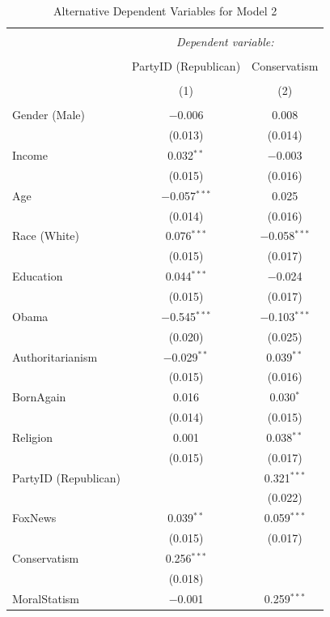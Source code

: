 \documentclass[12pt,]{article}
\begin{document}
\begin{table}[!htbp] \centering 
  \caption{Alternative Dependent Variables for Model 2} 
  \label{} 
\footnotesize 
\begin{tabular}{@{\extracolsep{5pt}}lcc} 
\\[-1.8ex]\hline 
\hline \\[-1.8ex] 
 & \multicolumn{2}{c}{\textit{Dependent variable:}} \\ 
\cline{2-3} 
\\[-1.8ex] & PartyID (Republican) & Conservatism \\ 
\\[-1.8ex] & (1) & (2)\\ 
\hline \\[-1.8ex] 
 Gender (Male) & $-$0.006 & 0.008 \\ 
  & (0.013) & (0.014) \\ 
  Income & 0.032$^{**}$ & $-$0.003 \\ 
  & (0.015) & (0.016) \\ 
  Age & $-$0.057$^{***}$ & 0.025 \\ 
  & (0.014) & (0.016) \\ 
  Race (White) & 0.076$^{***}$ & $-$0.058$^{***}$ \\ 
  & (0.015) & (0.017) \\ 
  Education & 0.044$^{***}$ & $-$0.024 \\ 
  & (0.015) & (0.017) \\ 
  Obama & $-$0.545$^{***}$ & $-$0.103$^{***}$ \\ 
  & (0.020) & (0.025) \\ 
  Authoritarianism & $-$0.029$^{**}$ & 0.039$^{**}$ \\ 
  & (0.015) & (0.016) \\ 
  BornAgain & 0.016 & 0.030$^{*}$ \\ 
  & (0.014) & (0.015) \\ 
  Religion & 0.001 & 0.038$^{**}$ \\ 
  & (0.015) & (0.017) \\ 
  PartyID (Republican) &  & 0.321$^{***}$ \\ 
  &  & (0.022) \\ 
  FoxNews & 0.039$^{**}$ & 0.059$^{***}$ \\ 
  & (0.015) & (0.017) \\ 
  Conservatism & 0.256$^{***}$ &  \\ 
  & (0.018) &  \\ 
  MoralStatism & $-$0.001 & 0.259$^{***}$ \\ 

\end{tabular}
\end{table}
\end{document}
